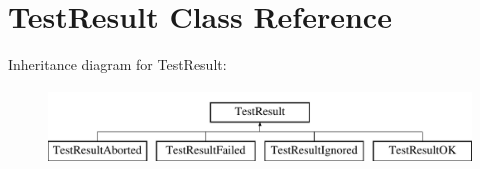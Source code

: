 \hypertarget{class_test_result}{\section{Test\-Result Class Reference}
\label{class_test_result}
}
Inheritance diagram for Test\-Result\-:\begin{figure}[H]
\begin{center}
\leavevmode
\includegraphics[height=2.000000cm]{class_test_result}
\end{center}
\end{figure}
